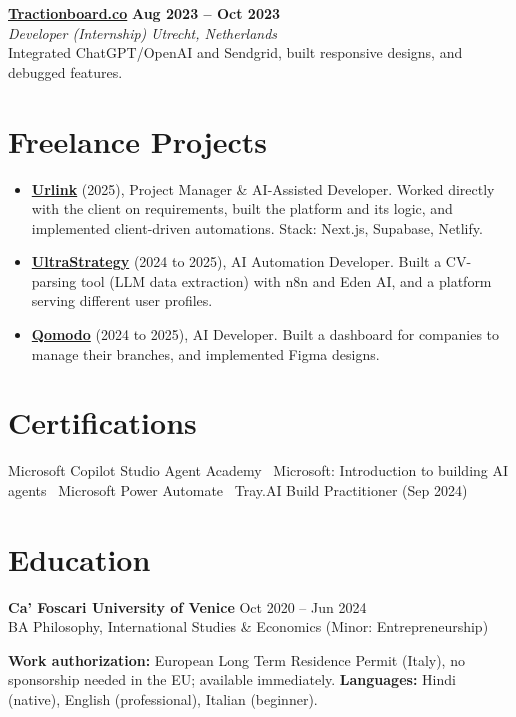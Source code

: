 \documentclass[a4paper,10pt]{article}
\newcommand{\role}[4]{%
 \textbf{#1} \hfill \textbf{#2}\\[1pt]%
 \textit{#3} \hfill \textit{#4}\\[2pt]%
}
\begin{document}
\role{\href{https://tractionboard.co}{Tractionboard.co}}{Aug 2023 -- Oct 2023}{Developer (Internship)}{Utrecht, Netherlands}
Integrated ChatGPT/OpenAI and Sendgrid, built responsive designs, and debugged features.

\section{Freelance Projects}
\begin{itemize}
 \item \textbf{\href{https://smarturlink.com/}{Urlink}} (2025), Project Manager \& AI-Assisted Developer. Worked directly with the client on requirements, built the platform and its logic, and implemented client-driven automations. Stack: Next.js, Supabase, Netlify.
 \item \textbf{\href{https://ultrastrategy.com}{UltraStrategy}} (2024 to 2025), AI Automation Developer. Built a CV-parsing tool (LLM data extraction) with n8n and Eden AI, and a platform serving different user profiles.
 \item \textbf{\href{https://www.qomodo.me/}{Qomodo}} (2024 to 2025), AI Developer. Built a dashboard for companies to manage their branches, and implemented Figma designs.
\end{itemize}

\section{Certifications}
Microsoft Copilot Studio Agent Academy \textbullet\ Microsoft: Introduction to building AI agents \textbullet\ Microsoft Power Automate \textbullet\ Tray.AI Build Practitioner (Sep 2024)

\section{Education}
\textbf{Ca' Foscari University of Venice} \hfill Oct 2020 -- Jun 2024\\
BA Philosophy, International Studies \& Economics (Minor: Entrepreneurship)

\vspace{2pt}
{\small \textbf{Work authorization:} European Long Term Residence Permit (Italy), no sponsorship needed in the EU; available immediately. \quad \textbf{Languages:} Hindi (native), English (professional), Italian (beginner).}
\end{document}
